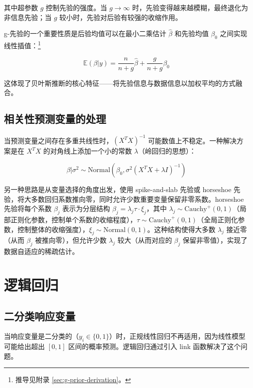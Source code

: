 其中超参数 $g$ 控制先验的强度。当 $g \to \infty$ 时，先验变得越来越模糊，最终退化为非信息先验；当 $g$ 较小时，先验对后验有较强的收缩作用。

g-先验的一个重要性质是后验均值可以在最小二乘估计 $\hat{\beta}$ 和先验均值 $\beta_0$ 之间实现线性插值：\footnote{推导见附录 \cref{sec:g-prior-derivation}。}

\begin{equation}
\mathbb{E}(\beta | y) = \frac{n}{n+g}\hat{\beta} + \frac{g}{n+g}\beta_0
\label{eq:g-prior-posterior-mean}
\end{equation}

这体现了贝叶斯推断的核心特征——将先验信息与数据信息以加权平均的方式融合。

\subsection{相关性预测变量的处理}

当预测变量之间存在多重共线性时，$(X^TX)^{-1}$ 可能数值上不稳定。一种解决方案是在 $X^TX$ 的对角线上添加一个小的常数 $\lambda$（岭回归的思想）：

\begin{equation}
\beta | \sigma^2 \sim \text{Normal}(\beta_0, \sigma^2(X^TX + \lambda I)^{-1})
\label{eq:ridge-prior}
\end{equation}

另一种思路是从变量选择的角度出发，使用 spike-and-slab 先验或 horseshoe 先验，将大多数回归系数推向零，同时允许少数重要变量保留非零系数。horseshoe 先验将每个系数 $\beta_j$ 表示为分层结构 $\beta_j = \lambda_j \tau \cdot \xi_j$，其中 $\lambda_j \sim \text{Cauchy}^+(0,1)$（局部正则化参数，控制单个系数的收缩程度），$\tau \sim \text{Cauchy}^+(0,1)$（全局正则化参数，控制整体的收缩强度），$\xi_j \sim \text{Normal}(0,1)$。这种结构使得大多数 $\lambda_j$ 接近零（从而 $\beta_j$ 被推向零），但允许少数 $\lambda_j$ 较大（从而对应的 $\beta_j$ 保留非零值），实现了数据自适应的稀疏估计。

\section{逻辑回归}

\subsection{二分类响应变量}

当响应变量是二分类的（$y_i \in \{0, 1\}$）时，正规线性回归不再适用，因为线性模型可能给出超出 $[0,1]$ 区间的概率预测。逻辑回归通过引入 link 函数解决了这个问题。


